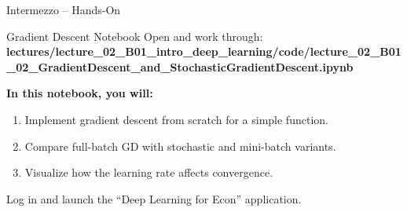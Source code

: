 \documentclass[aspectratio=169,11pt]{beamer}
\begin{document}
\begin{frame}{Intermezzo -- Hands-On}
\begin{block}{Gradient Descent Notebook}
Open and work through: \textbf{lectures/lecture\_02\_B01\_intro\_deep\_learning/code/lecture\_02\_B01\_02\_GradientDescent\_and\_StochasticGradientDescent.ipynb}
\end{block}

\vspace{0.5cm}
\textbf{In this notebook, you will:}
\begin{enumerate}
    \item Implement gradient descent from scratch for a simple function.
    \item Compare full-batch GD with stochastic and mini-batch variants.
    \item Visualize how the learning rate affects convergence.
\end{enumerate}

\vspace{0.5cm}
\begin{center}
{\small Log in and launch the ``Deep Learning for Econ'' application.}
\end{center}
\end{frame}
\end{document}
